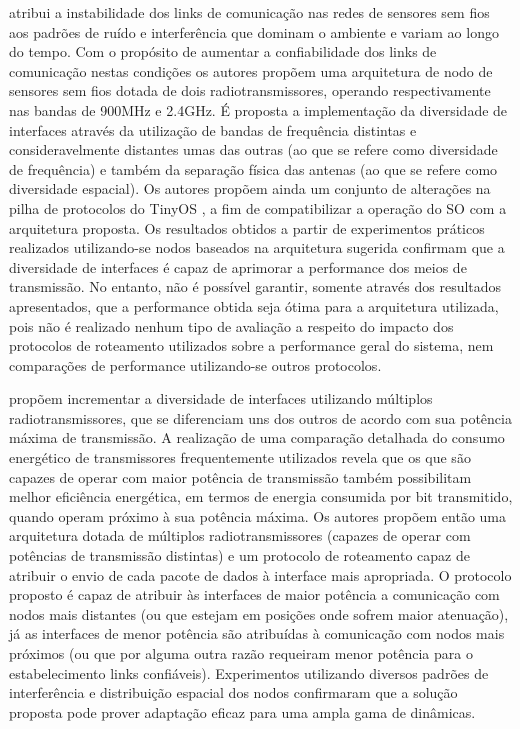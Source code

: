 \documentclass[
	12pt,				%
	openright,			%
	oneside,
	a4paper,			%
	english,			%
	french,				%
	spanish,			%
	brazil				%
	]{abntex2}
\begin{document}
 atribui a instabilidade dos links de comunicação nas redes de sensores sem fios aos padrões de ruído e interferência que dominam o ambiente e variam ao longo do tempo. Com o propósito de aumentar a confiabilidade dos links de comunicação nestas condições os autores propõem uma arquitetura de nodo de sensores sem fios dotada de dois radiotransmissores, operando respectivamente nas bandas de 900MHz e 2.4GHz. É proposta a implementação da diversidade de interfaces através da utilização de bandas de frequência distintas e consideravelmente distantes umas das outras (ao que se refere como diversidade de frequência) e também da separação física das antenas (ao que se refere como diversidade espacial). Os autores propõem ainda um conjunto de alterações na pilha de protocolos do TinyOS \cite{Levis2005}, a fim de compatibilizar a operação do SO com a arquitetura proposta. Os resultados obtidos a partir de experimentos práticos realizados utilizando-se nodos baseados na arquitetura sugerida confirmam que a diversidade de interfaces é capaz de aprimorar a performance dos meios de transmissão. No entanto, não é possível garantir, somente através dos resultados apresentados, que a performance obtida seja ótima para a arquitetura utilizada, pois não é realizado nenhum tipo de avaliação a respeito do impacto dos protocolos de roteamento utilizados sobre a performance geral do sistema, nem comparações de performance utilizando-se outros protocolos.

 propõem incrementar a diversidade de interfaces utilizando múltiplos radiotransmissores, que se diferenciam uns dos outros de acordo com sua potência máxima de transmissão. A realização de uma comparação detalhada do consumo energético de transmissores frequentemente utilizados revela que os que são capazes de operar com maior potência de transmissão também possibilitam melhor eficiência energética, em termos de energia consumida por bit transmitido, quando operam próximo à sua potência máxima. Os autores propõem então uma arquitetura dotada de múltiplos radiotransmissores (capazes de operar com potências de transmissão distintas) e um protocolo de roteamento capaz de atribuir o envio de cada pacote de dados à interface mais apropriada. O protocolo proposto é capaz de atribuir às interfaces de maior potência a comunicação com nodos mais distantes (ou que estejam em posições onde sofrem maior atenuação), já as interfaces de menor potência são atribuídas à comunicação com nodos mais próximos (ou que por alguma outra razão requeiram menor potência para o estabelecimento links confiáveis). Experimentos utilizando diversos padrões de interferência e distribuição espacial dos nodos confirmaram que a solução proposta pode prover adaptação eficaz para uma ampla gama de dinâmicas.
\end{document}
